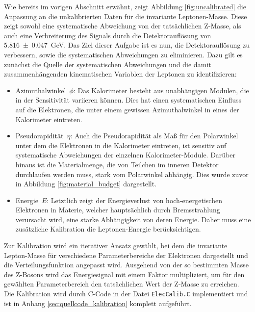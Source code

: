 \documentclass[11pt, a4paper]{article}
\numberwithin{equation}{section}
\begin{document}
Wie bereits im vorigen Abschnitt erwähnt, zeigt Abbildung \ref{fig:uncalibrated} die Anpassung an die unkalibrierten Daten für die invariante Leptonen-Masse.
Diese zeigt sowohl eine systematische Abweichung von der tatsächlichen Z-Masse, als auch eine Verbreiterung des Signals durch die Detektorauflösung von \SI{5.816+-0.047}{\GeV}.
Das Ziel dieser Aufgabe ist es nun, die Detektorauflösung zu verbessern, sowie die systematischen Abweichungen zu eliminieren.
Dazu gilt es zunächst die Quelle der systematischen Abweichungen und die damit zusammenhängenden kinematischen Variablen der Leptonen zu identifizieren:
\begin{itemize}
	\item Azimuthalwinkel~$\phi$:
		Das Kalorimeter besteht aus unabhängigen Modulen, die in der Sensitivität variieren können.
		Dies hat einen systematischen Einfluss auf die Elektronen, die unter einem gewissen Azimuthalwinkel in eines der Kalorimeter eintreten.		
	
	\item Pseudorapidität~$\eta$:
		Auch die Pseudorapidität als Maß für den Polarwinkel unter dem die Elektronen in die Kalorimeter eintreten, ist sensitiv auf systematische Abweichungen der einzelnen Kalorimeter-Module.
		Darüber hinaus ist die Materialmenge, die von Teilchen im inneren Detektor durchlaufen werden muss, stark vom Polarwinkel abhängig. Dies wurde zuvor in Abbildung \ref{fig:material_budget} dargestellt.
		
	\item Energie~$E$:
		Letztlich zeigt der Energieverlust von hoch-energetischen Elektronen in Materie, welcher hauptsächlich durch Bremsstrahlung verursacht wird, eine starke Abhängigkeit von deren Energie.
		Daher muss eine zusätzliche Kalibration die Leptonen-Energie berücksichtigen.
\end{itemize}
Zur Kalibration wird ein iterativer Ansatz gewählt, bei dem die invariante Lepton-Masse für verschiedene Parameterbereiche der Elektronen dargestellt und die Verteilungsfunktion angepasst wird.
Ausgehend von der so bestimmten Masse des Z-Bosons wird das Energiesignal mit einem Faktor multipliziert, um für den gewählten Parameterbereich den tatsächlichen Wert der Z-Masse zu erreichen.
Die Kalibration wird durch C-Code in der Datei \texttt{ElecCalib.C} implementiert und ist in Anhang \ref{sec:quellcode_kalibration} komplett aufgeführt.
\end{document}
